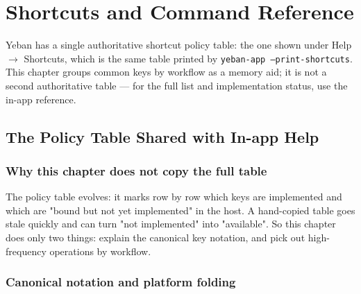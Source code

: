 
\chapter{Shortcuts and Command Reference}
\label{ch:shortcuts}






Yeban has a single authoritative shortcut policy table: the one shown under Help $\to$
Shortcuts, which is the same table printed by \texttt{yeban-app --print-shortcuts}.
This chapter groups common keys by workflow as a memory aid; it is not a second
authoritative table — for the full list and implementation status, use the in-app
reference.

\section{The Policy Table Shared with In-app Help}

\subsection{Why this chapter does not copy the full table}

The policy table evolves: it marks row by row which keys are implemented and which are
"bound but not yet implemented" in the host. A hand-copied table goes stale quickly and
can turn "not implemented" into "available". So this chapter does only two things:
explain the canonical key notation, and pick out high-frequency operations by workflow.

\subsection{Canonical notation and platform folding}

